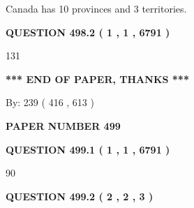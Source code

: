 \documentclass[12pt]{article}
\begin{document}
 
Canada has 10  provinces and 3 territories.
 
 
 
 
  
\vspace{0.2in}
  
{\textbf{\Large{QUESTION
498.2 
 ( 1 , 1 , 6791 )
}}}
  
  
 
 
\noindent{}

131
 
 
   
   
 \vspace{0.2in}
 
   
   
   
   
\vspace{1.0in} 
{\textbf{\large{ *** END OF PAPER, THANKS *** }}} 
   
   
\hspace{1.0in} By: 
 239 ( 416 ,  613 )
   
   
   
   
\newpage 
\setcounter{page}{ 
   499001 } 
   
   
   
   
 {\textbf{ \Large{ PAPER NUMBER  499  }}}
   
   
\vspace{0.2in}
   
   
   
   
   
   
 \vspace{0.2in}
 
 
 
 
   
   
  
\vspace{0.2in}
  
{\textbf{\Large{QUESTION
499.1 
 ( 1 , 1 , 6791 )
}}}
  
  
 
 
\noindent{}

90
 
 
  
\vspace{0.2in}
  
{\textbf{\Large{QUESTION
499.2 
 ( 2 , 2 , 3 )
}}}
  
\end{document}
